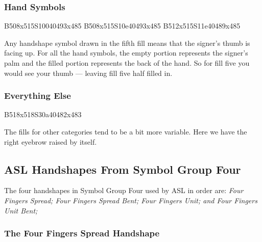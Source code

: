 \documentclass{article}
\begin{document}
\subsubsection{Hand Symbols}

\begin{center}
B508x515S10040493x485 B508x515S10e40493x485 B512x515S11e40489x485
\end{center}

Any handshape symbol drawn in the fifth fill means that the signer's thumb is facing up.
For all the hand symbols, the empty portion represents the signer's palm and the filled portion represents the back of the hand.
So for fill five you would see your thumb --- leaving fill five half filled in.

\subsubsection{Everything Else}

\begin{center}
B518x518S30a40482x483
\end{center}

The fills for other categories tend to be a bit more variable.
Here we have the right eyebrow raised by itself.

\subsection{ASL Handshapes From Symbol Group Four}

The four handshapes in Symbol Group Four used by ASL in order are:
{\it
Four Fingers Spread;
Four Fingers Spread Bent;
Four Fingers Unit;
and Four Fingers Unit Bent;
}

\subsubsection{The Four Fingers Spread Handshape}
\end{document}
